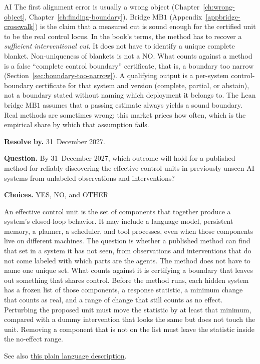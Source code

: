 \begin{authbar}{AI}
The first alignment error is usually a wrong object (Chapter~\ref{ch:wrong-object}, Chapter~\ref{ch:finding-boundary}).
Bridge \(\text{MB1}\) (Appendix~\ref{appbridge-crosswalk}) is the claim that a measured cut is sound enough for the certified unit to be the real control locus.
In the book's terms, the method has to recover a \emph{sufficient interventional cut}.
It does not have to identify a unique complete blanket. Non-uniqueness of blankets is not a NO.
What counts against a method is a false ``complete control boundary'' certificate, that is, a boundary too narrow (Section~\ref{sec:boundary-too-narrow}).
A qualifying output is a per-system control-boundary certificate for that system and version (complete, partial, or abstain), not a boundary stated without naming which deployment it belongs to.
The Lean bridge \(\text{MB1}\) assumes that a passing estimate always yields a sound boundary.
Real methods are sometimes wrong; this market prices how often, which is the empirical share by which that assumption fails.
\end{authbar}
\begin{predictionbox}
\textbf{Resolve by.} 31~December 2027.

\textbf{Question.}
By 31~December 2027, which outcome will hold for a published method for reliably discovering the effective control units in previously unseen AI systems from unlabeled observations and interventions?

\textbf{Choices.} YES, NO, and OTHER
\end{predictionbox}
\begin{predictionbackground}
An effective control unit is the set of components that together produce a system's closed-loop behavior.
It may include a language model, persistent memory, a planner, a scheduler, and tool processes, even when those components live on different machines.
The question is whether a published method can find that set in a system it has not seen, from observations and interventions that do not come labeled with which parts are the agents.
The method does not have to name one unique set.
What counts against it is certifying a boundary that leaves out something that shares control.
Before the method runs, each hidden system has a frozen list of those components, a response statistic, a minimum change that counts as real, and a range of change that still counts as no effect.
Perturbing the proposed unit must move the statistic by at least that minimum, compared with a dummy intervention that looks the same but does not touch the unit.
Removing a component that is not on the list must leave the statistic inside the no-effect range.

See also \href{https://towards-alignment.com/cards/how-would-you-find-what-decides/}{this plain language description}.
\end{predictionbackground}
